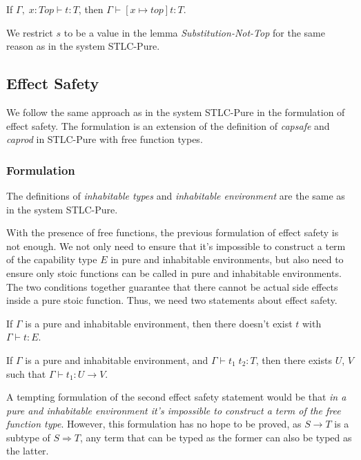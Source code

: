 \begin{lemma}
  If $\Gamma,\; x:Top \vdash t : T$, then $\Gamma \vdash [x \mapsto top]t : T$.
\end{lemma}

We restrict $s$ to be a value in the lemma \emph{Substitution-Not-Top}
for the same reason as in the system STLC-Pure.

\subsection{Effect Safety}

We follow the same approach as in the system STLC-Pure in the
formulation of effect safety. The formulation is an extension of the
definition of \emph{capsafe} and \emph{caprod} in STLC-Pure with free
function types.

\subsubsection{Formulation}

The definitions of \emph{inhabitable types} and \emph{inhabitable
  environment} are the same as in the system STLC-Pure.

With the presence of free functions, the previous formulation of
effect safety is not enough. We not only need to ensure that it's
impossible to construct a term of the capability type $E$ in pure and
inhabitable environments, but also need to ensure only stoic functions
can be called in pure and inhabitable environments. The two conditions
together guarantee that there cannot be actual side effects inside a
pure stoic function. Thus, we need two statements about effect safety.

\begin{definition}
  If $\Gamma$ is a pure and inhabitable environment, then there
  doesn't exist $t$ with $\Gamma \vdash t : E$.
\end{definition}

\begin{definition}
  If $\Gamma$ is a pure and inhabitable environment, and
  $\Gamma \vdash t_1 \; t_2 : T$, then there exists $U$, $V$ such that
  $\Gamma \vdash t_1 : U \to V$.
\end{definition}

A tempting formulation of the second effect safety statement would be
that \emph{in a pure and inhabitable environment it's impossible to
  construct a term of the free function type}. However, this
formulation has no hope to be proved, as $S \to T$ is a subtype of
$S \Rightarrow T$, any term that can be typed as the former can also
be typed as the latter.

